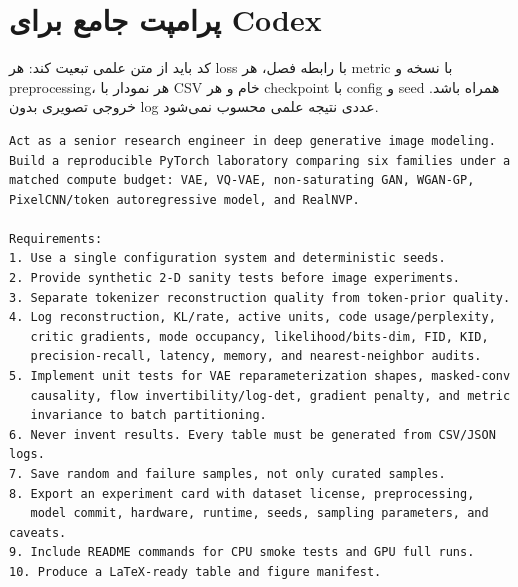 \documentclass[12pt,openany,oneside]{book}
\begin{document}
\section{پرامپت جامع برای Codex}
\begin{codecontract}
کد باید از متن علمی تبعیت کند: هر loss با رابطه فصل، هر metric با نسخه و preprocessing، هر نمودار با CSV خام و هر checkpoint با config و seed همراه باشد. خروجی تصویری بدون log عددی نتیجه علمی محسوب نمی‌شود.
\end{codecontract}

\begin{latin}
\begin{lstlisting}
Act as a senior research engineer in deep generative image modeling.
Build a reproducible PyTorch laboratory comparing six families under a
matched compute budget: VAE, VQ-VAE, non-saturating GAN, WGAN-GP,
PixelCNN/token autoregressive model, and RealNVP.

Requirements:
1. Use a single configuration system and deterministic seeds.
2. Provide synthetic 2-D sanity tests before image experiments.
3. Separate tokenizer reconstruction quality from token-prior quality.
4. Log reconstruction, KL/rate, active units, code usage/perplexity,
   critic gradients, mode occupancy, likelihood/bits-dim, FID, KID,
   precision-recall, latency, memory, and nearest-neighbor audits.
5. Implement unit tests for VAE reparameterization shapes, masked-conv
   causality, flow invertibility/log-det, gradient penalty, and metric
   invariance to batch partitioning.
6. Never invent results. Every table must be generated from CSV/JSON logs.
7. Save random and failure samples, not only curated samples.
8. Export an experiment card with dataset license, preprocessing,
   model commit, hardware, runtime, seeds, sampling parameters, and caveats.
9. Include README commands for CPU smoke tests and GPU full runs.
10. Produce a LaTeX-ready table and figure manifest.
\end{lstlisting}
\end{latin}
\end{document}
